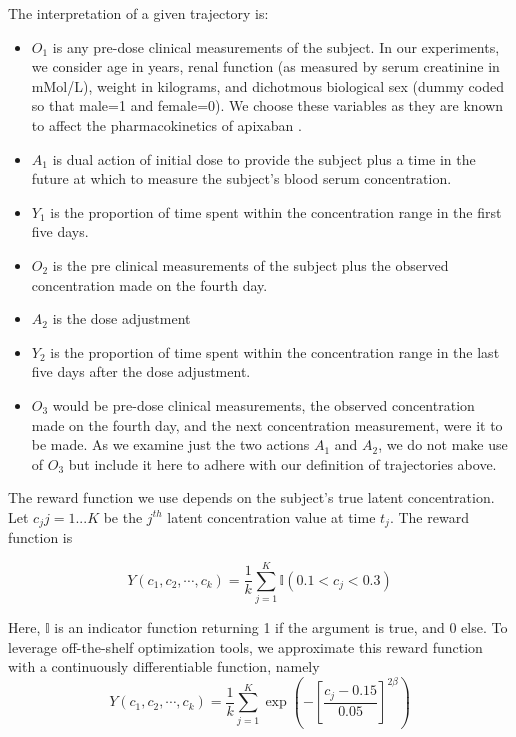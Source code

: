 \noindent The interpretation of a given trajectory is:
\begin{itemize}
	\item $ O_1 $ is any pre-dose clinical measurements of the subject.  In our experiments, we consider age in years, renal function (as measured by serum creatinine in mMol/L), weight in kilograms, and dichotmous biological sex (dummy coded so that male=1 and female=0).  We choose these variables as they are known to affect the pharmacokinetics of apixaban \cite{byon2019apixaban}.  
	\item $ A_1 $ is dual action of initial dose to provide the subject plus a time in the future at which to measure the subject’s blood serum concentration.
	\item $ Y_1 $ is the proportion of time spent within the concentration range in the first five days.
	\item $ O_2 $ is the pre clinical measurements of the subject plus the observed concentration made on the fourth day.
	\item $ A_2 $ is the dose adjustment
	\item $ Y_2 $ is the proportion of time spent within the concentration range in the last five days after the dose adjustment.
	\item $ O_3 $ would be pre-dose clinical measurements, the observed concentration made on the fourth day, and the next concentration measurement, were it to be made. As we examine just the two actions $ A_1 $ and $ A_2 $, we do not make use of $ O_3 $ but include it here to adhere with our definition of trajectories above.
\end{itemize}

The reward function we use depends on the subject’s true latent concentration. Let $ c_j j=1...K $ be the $ j^{th}$ latent concentration value at time $ t_j $.  The reward function is 

\begin{equation}
Y(c_1, c_2, \cdots, c_k) = \dfrac{1}{k}\sum_{j=1}^K \mathbb{I}(0.1 < c_j < 0.3)
\end{equation}

\noindent Here, $ \mathbb{I} $ is an indicator function returning 1 if the argument is true, and 0 else.  To leverage off-the-shelf optimization tools, we approximate this reward function with a continuously differentiable function, namely
\begin{equation}
Y(c_1, c_2, \cdots, c_k) = \dfrac{1}{k}\sum_{j=1}^K \exp\left( - \left[ \dfrac{c_j-0.15}{0.05} \right]^{2\beta} \right)
\end{equation}


